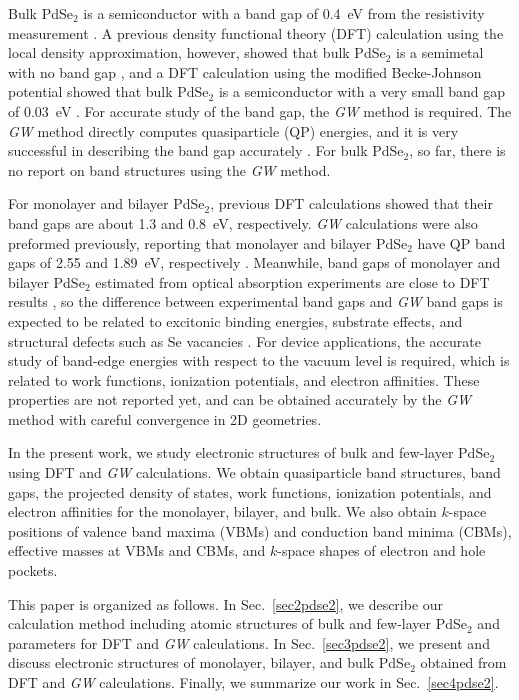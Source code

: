 \documentclass[aps,prb,longbibliography,twocolumn]{revtex4-2}
\begin{document}
Bulk PdSe$_2$ is a semiconductor with a band gap of 0.4~eV from the resistivity measurement \cite{Hulliger1965}.
A previous density functional theory (DFT) calculation using the local density approximation, however, showed that bulk PdSe$_2$ is a semimetal with no band gap \cite{Hamidani2010}, and a DFT calculation using the modified Becke-Johnson potential showed that bulk PdSe$_2$ is a semiconductor with a very small band gap of 0.03~eV \cite{Sun2015}. 
For accurate study of the band gap, the {\em GW} method \cite{Hedin1965,Strinati1980,Strinati1982,Hybertsen1985,Hybertsen1986} is required.
The {\em GW} method directly computes quasiparticle (QP) energies,
and it is very successful in describing the band gap accurately \cite{Schilfgaarde2006}.
For bulk PdSe$_2$, so far, there is no report on band structures using the {\em GW} method.


For monolayer and bilayer PdSe$_2$, previous DFT calculations \cite{Oyedele2017, Kuklin2019,Lebegue2013} showed that their band gaps are about 1.3 and 0.8~eV, respectively. {\em GW} calculations were also preformed previously, reporting that monolayer and bilayer PdSe$_2$ have QP band gaps of 2.55 and 1.89~eV, respectively \cite{Kuklin2019}.
Meanwhile, band gaps of monolayer and bilayer PdSe$_2$ estimated from optical absorption experiments are close to DFT results \cite{Oyedele2017},
so the difference between experimental band gaps and {\em GW} band gaps is expected to be related to excitonic binding energies, substrate effects, and structural defects such as Se vacancies \cite{Kuklin2019, Ugeda2014}.
For device applications, the accurate study of band-edge energies with respect to the vacuum level is required, which is related to work functions, ionization potentials, and electron affinities. These properties are not reported yet, and can be obtained accurately by the {\em GW} method with careful convergence in 2D geometries.


In the present work,
we study electronic structures of bulk and few-layer PdSe$_2$ 
using DFT and {\em GW} calculations.
We obtain quasiparticle 
band structures, band gaps, the projected density of states, work functions, ionization potentials, and electron affinities for the monolayer, bilayer, and bulk.
We also obtain $k$-space positions of valence band maxima (VBMs) and conduction band minima (CBMs), effective masses at VBMs and CBMs, and $k$-space shapes of electron and hole pockets.


This paper is organized as follows. 
In Sec.~\ref{sec2pdse2}, we describe our calculation method including atomic structures of bulk and few-layer PdSe$_2$ and
parameters for DFT and {\em GW} calculations. 
In Sec.~\ref{sec3pdse2}, we present and discuss 
electronic structures of monolayer, bilayer, and bulk PdSe$_2$ obtained from DFT and {\em GW} calculations.
Finally, we summarize our work in Sec.~\ref{sec4pdse2}.
\end{document}
